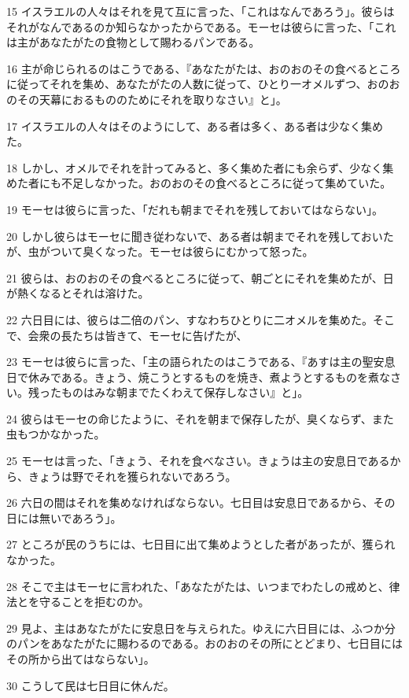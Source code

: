 \par 15 イスラエルの人々はそれを見て互に言った、「これはなんであろう」。彼らはそれがなんであるのか知らなかったからである。モーセは彼らに言った、「これは主があなたがたの食物として賜わるパンである。
\par 16 主が命じられるのはこうである、『あなたがたは、おのおのその食べるところに従ってそれを集め、あなたがたの人数に従って、ひとり一オメルずつ、おのおのその天幕におるもののためにそれを取りなさい』と」。
\par 17 イスラエルの人々はそのようにして、ある者は多く、ある者は少なく集めた。
\par 18 しかし、オメルでそれを計ってみると、多く集めた者にも余らず、少なく集めた者にも不足しなかった。おのおのその食べるところに従って集めていた。
\par 19 モーセは彼らに言った、「だれも朝までそれを残しておいてはならない」。
\par 20 しかし彼らはモーセに聞き従わないで、ある者は朝までそれを残しておいたが、虫がついて臭くなった。モーセは彼らにむかって怒った。
\par 21 彼らは、おのおのその食べるところに従って、朝ごとにそれを集めたが、日が熱くなるとそれは溶けた。
\par 22 六日目には、彼らは二倍のパン、すなわちひとりに二オメルを集めた。そこで、会衆の長たちは皆きて、モーセに告げたが、
\par 23 モーセは彼らに言った、「主の語られたのはこうである、『あすは主の聖安息日で休みである。きょう、焼こうとするものを焼き、煮ようとするものを煮なさい。残ったものはみな朝までたくわえて保存しなさい』と」。
\par 24 彼らはモーセの命じたように、それを朝まで保存したが、臭くならず、また虫もつかなかった。
\par 25 モーセは言った、「きょう、それを食べなさい。きょうは主の安息日であるから、きょうは野でそれを獲られないであろう。
\par 26 六日の間はそれを集めなければならない。七日目は安息日であるから、その日には無いであろう」。
\par 27 ところが民のうちには、七日目に出て集めようとした者があったが、獲られなかった。
\par 28 そこで主はモーセに言われた、「あなたがたは、いつまでわたしの戒めと、律法とを守ることを拒むのか。
\par 29 見よ、主はあなたがたに安息日を与えられた。ゆえに六日目には、ふつか分のパンをあなたがたに賜わるのである。おのおのその所にとどまり、七日目にはその所から出てはならない」。
\par 30 こうして民は七日目に休んだ。
